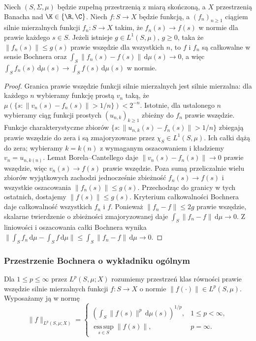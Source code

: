 \begin{twierdzenie}
\label{thm:bochner-dct15b}
Niech $(S,\Sigma,\mu)$ będzie zupełną przestrzenią z miarą
skończoną, a $X$ przestrzenią Banacha nad $\K\in\{\R,\C\}$.
Niech $f:S\to X$ będzie funkcją, a $(f_n)_{n\ge1}$ ciągiem
silnie mierzalnych funkcji $f_n:S\to X$ takim, że
$f_n(s)\to f(s)$ w normie dla prawie każdego $s\in S$.
Jeżeli istnieje $g\in L^1(S,\mu)$, $g\ge0$, taka że
$\|f_n(s)\|\le g(s)$ prawie wszędzie dla wszystkich $n$,
to $f$ i $f_n$ są całkowalne w sensie Bochnera oraz
$\int_S\|f_n(s)-f(s)\|\,\mathrm d\mu(s)\to0$, a więc
$\int_S f_n(s)\,\mathrm d\mu(s)\to\int_S f(s)\,\mathrm d\mu(s)$ w normie.
\end{twierdzenie}
\begin{proof}
Granica prawie wszędzie funkcji silnie mierzalnych jest
silnie mierzalna: dla każdego $n$ wybieramy funkcję prostą $v_n$
taką, że $\mu(\{s:\|v_n(s)-f_n(s)\|>1/n\})<2^{-n}$.
Istotnie, dla ustalonego $n$ wybieramy ciąg funkcji prostych
$(u_{n,k})_{k\ge1}$ zbieżny do $f_n$ prawie wszędzie.
Funkcje charakterystyczne zbiorów
$\{s:\|u_{n,k}(s)-f_n(s)\|>1/n\}$ zbiegają prawie wszędzie
do zera i są zmajoryzowane przez $\chi_S\in L^1(S,\mu)$.
Ich całki dążą do zera; wybieramy $k=k(n)$ z wymaganym
oszacowaniem i kładziemy $v_n=u_{n,k(n)}$. Lemat Borela--Cantellego daje
$\|v_n(s)-f_n(s)\|\to0$ prawie wszędzie, więc $v_n(s)\to f(s)$
prawie wszędzie. Poza sumą przeliczalnie wielu zbiorów wyjątkowych zachodzi
jednocześnie zbieżność $f_n(s)\to f(s)$ i wszystkie
oszacowania $\|f_n(s)\|\le g(s)$. Przechodząc do granicy
w tych ostatnich, dostajemy $\|f(s)\|\le g(s)$.
Kryterium całkowalności Bochnera daje całkowalność
wszystkich $f_n$ i $f$. Ponieważ
$\|f_n-f\|\le2g$ prawie wszędzie, skalarne twierdzenie
o zbieżności zmajoryzowanej daje
$\int_S\|f_n-f\|\,\mathrm d\mu\to0$.
Z liniowości i oszacowania całki Bochnera wynika
$\|\int_S f_n\,\mathrm d\mu-\int_S f\,\mathrm d\mu\|
\le\int_S\|f_n-f\|\,\mathrm d\mu\to0$.
\end{proof}

\subsubsection{Przestrzenie Bochnera o wykładniku ogólnym}

\begin{definicja}
\label{def:bochner-lp15b}
Dla $1\le p\le\infty$ przez $L^p(S,\mu;X)$
rozumiemy przestrzeń klas równości prawie wszędzie
silnie mierzalnych funkcji $f:S\to X$ o normie
$\|f(\cdot)\|\in L^p(S,\mu)$.
Wyposażamy ją w normę
\[
 \|f\|_{L^p(S,\mu;X)}=
 \begin{cases}
  \left(\int_S\|f(s)\|^p\,\mathrm d\mu(s)\right)^{1/p},
      &1\le p<\infty,\\
  \operatorname*{ess\,sup}_{s\in S}\|f(s)\|,&p=\infty.
 \end{cases}
\]
\end{definicja}

